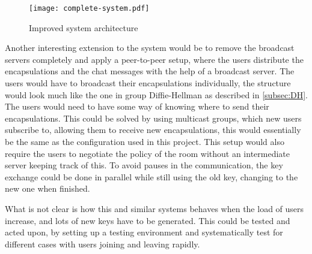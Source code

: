 \begin{figure}
\centering
\texttt{[image: complete-system.pdf]}
\caption{Improved system architecture}
\label{fig:improved}
\end{figure}

\par Another interesting extension to the system would be to remove the broadcast servers completely and apply a peer-to-peer setup, where the users distribute the encapsulations and the chat messages with the help of a broadcast server. The users would have to broadcast their encapsulations individually, the structure would look much like the one in group Diffie-Hellman as described in \ref{subsec:DH}. The users would need to have some way of knowing where to send their encapsulations. This could be solved by using multicast groups, which new users subscribe to, allowing them to receive new encapsulations, this would essentially be the same as the configuration used in this project. This setup would also require the users to negotiate the policy of the room without an intermediate server keeping track of this. To avoid pauses in the communication, the key exchange could be done in parallel while still using the old key, changing to the new one when finished. 

\par What is not clear is how this and similar systems behaves when the load of users increase, and lots of new keys have to be generated. This could be tested and acted upon, by setting up a testing environment and systematically test for different cases with users joining and leaving rapidly.

